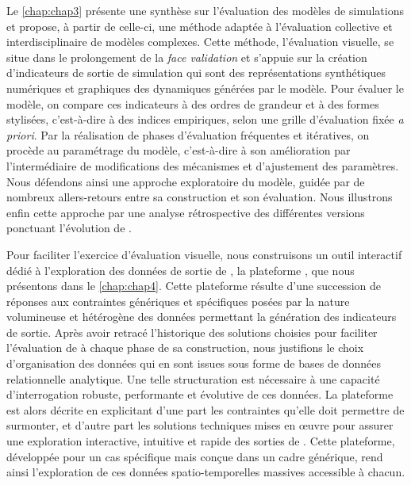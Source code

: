 Le \cref{chap:chap3} présente une synthèse sur l'évaluation des modèles de simulations et propose, à partir de celle-ci, une méthode adaptée à l'évaluation collective et interdisciplinaire de modèles complexes. Cette méthode, l'\og évaluation visuelle\fg{}, se situe dans le prolongement de la \textit{face validation} et s'appuie sur la création d'\og{}indicateurs de sortie de simulation\fg{} qui sont des représentations synthétiques numériques et graphiques des dynamiques générées par le modèle. Pour évaluer le modèle, on compare ces indicateurs à des \og ordres de grandeur\fg{} et à des \og formes stylisées\fg{}, c'est-à-dire à des \og indices empiriques\fg{}, selon une grille d'évaluation fixée \textit{a priori}. Par la réalisation de phases d'évaluation fréquentes et itératives, on procède au \og paramétrage\fg{} du modèle, c'est-à-dire à son amélioration par l'intermédiaire de modifications des mécanismes et d'ajustement des paramètres. Nous défendons ainsi une approche exploratoire du modèle, guidée par de nombreux allers-retours entre sa construction et son évaluation. Nous illustrons enfin cette approche par une analyse rétrospective des différentes versions ponctuant l'évolution de \simfeodal{}.

Pour faciliter l'exercice d'évaluation visuelle, nous construisons un outil interactif dédié à l'exploration des données de sortie de \simfeodal{}, la plateforme \simedb{}, que nous présentons dans le \cref{chap:chap4}.
Cette plateforme résulte d'une succession de réponses aux contraintes génériques et spécifiques posées par la nature volumineuse et hétérogène des données permettant la génération des indicateurs de sortie.
Après avoir retracé l'historique des solutions choisies pour faciliter l'évaluation de \simfeodal{} à chaque phase de sa construction, nous justifions le choix d'organisation des données qui en sont issues sous forme de bases de données relationnelle analytique. Une telle structuration est nécessaire à une capacité d'interrogation robuste, performante et évolutive de ces données. La plateforme \simedb{} est alors décrite en explicitant d'une part les contraintes qu'elle doit permettre de surmonter, et d'autre part les solutions techniques mises en œuvre pour assurer une exploration interactive, intuitive et rapide des sorties de \simfeodal{}. Cette plateforme, développée pour un cas spécifique mais conçue dans un cadre générique, rend ainsi l'exploration de ces données spatio-temporelles massives accessible à chacun.



